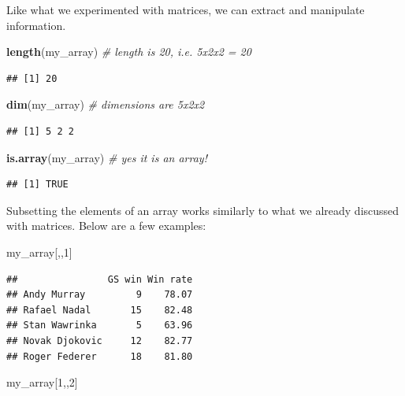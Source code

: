 \documentclass[12pt,]{krantz}
\newenvironment{Shaded}{\begin{snugshade}}{\end{snugshade}}
\newcommand{\KeywordTok}[1]{\textcolor[rgb]{0.27,0.27,0.27}{\textbf{#1}}}
\newcommand{\DecValTok}[1]{\textcolor[rgb]{0.06,0.06,0.06}{#1}}
\newcommand{\CommentTok}[1]{\textcolor[rgb]{0.37,0.37,0.37}{\textit{#1}}}
\newcommand{\NormalTok}[1]{#1}
\begin{document}
Like what we experimented with matrices, we can extract and manipulate
information.

\begin{Shaded}
\begin{Highlighting}[]
\KeywordTok{length}\NormalTok{(my_array)    }\CommentTok{# length is 20, i.e. 5x2x2 = 20}
\end{Highlighting}
\end{Shaded}

\begin{verbatim}
## [1] 20
\end{verbatim}

\begin{Shaded}
\begin{Highlighting}[]
\KeywordTok{dim}\NormalTok{(my_array)       }\CommentTok{# dimensions are 5x2x2}
\end{Highlighting}
\end{Shaded}

\begin{verbatim}
## [1] 5 2 2
\end{verbatim}

\begin{Shaded}
\begin{Highlighting}[]
\KeywordTok{is.array}\NormalTok{(my_array)  }\CommentTok{# yes it is an array!}
\end{Highlighting}
\end{Shaded}

\begin{verbatim}
## [1] TRUE
\end{verbatim}

Subsetting the elements of an array works similarly to what we already
discussed with matrices. Below are a few examples:

\begin{Shaded}
\begin{Highlighting}[]
\NormalTok{my_array[,,}\DecValTok{1}\NormalTok{]}
\end{Highlighting}
\end{Shaded}

\begin{verbatim}
##                GS win Win rate
## Andy Murray         9    78.07
## Rafael Nadal       15    82.48
## Stan Wawrinka       5    63.96
## Novak Djokovic     12    82.77
## Roger Federer      18    81.80
\end{verbatim}

\begin{Shaded}
\begin{Highlighting}[]
\NormalTok{my_array[}\DecValTok{1}\NormalTok{,,}\DecValTok{2}\NormalTok{]}
\end{Highlighting}
\end{Shaded}
\end{document}
